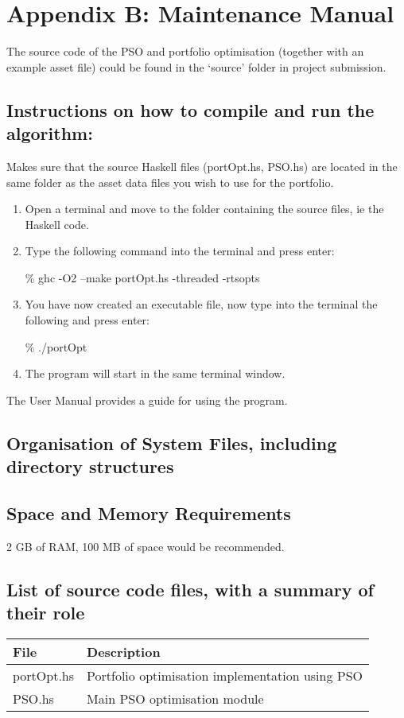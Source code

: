 \chapter*{Appendix B: Maintenance Manual}
The source code of the PSO and portfolio optimisation (together with an example asset file) could be found in the `source' folder in project submission.

\section*{Instructions on how to compile and run the algorithm:} 
  Makes sure that the source Haskell files (portOpt.hs, PSO.hs) are located in the same folder as the asset data files you wish to use for the portfolio.

  \begin{enumerate}
    \item Open a terminal and move to the folder containing the source files, ie the Haskell code.
    \item Type the following command into the terminal and press enter:
  \begin{center} \% ghc -O2 --make portOpt.hs -threaded -rtsopts \end{center}
    \item You have now created an executable file, now type into the terminal the following and press enter:
  \begin{center} \% ./portOpt \end{center}
    \item The program will start in the same terminal window.
  \end{enumerate}
  The User Manual provides a guide for using the program. \\

\section*{Organisation of System Files, including directory structures} 

\section*{Space and Memory Requirements}
  2 GB of RAM, 100 MB of space would be recommended.

\section*{List of source code files, with a summary of their role}
  \begin{tabular}{|l|l|}
    \hline
    File & Description \\
    \hline
    portOpt.hs & Portfolio optimisation implementation using PSO \\
    \hline
    PSO.hs & Main PSO optimisation module \\
    \hline
  \end{tabular}


